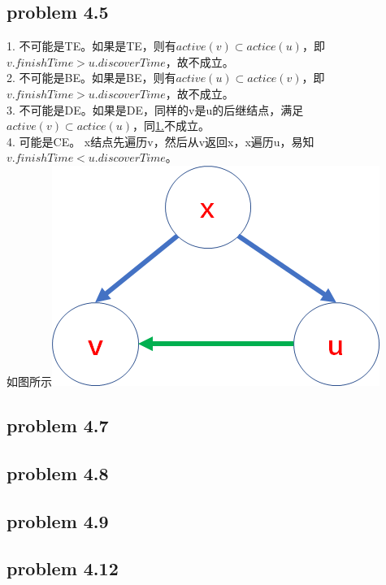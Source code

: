 \documentclass[11pt,a4paper,oneside,oldfontcommands]{ctexart}
\begin{document}
{\subsection*{problem 4.5}}
\noindent \hypertarget{1.}{1. }不可能是TE。如果是TE，则有$active(v)\subset actice(u)$，即$v.finishTime>u.discoverTime$，故不成立。\\
2. 不可能是BE。如果是BE，则有$active(u)\subset actice(v)$，即$v.finishTime>u.discoverTime$，故不成立。\\
3. 不可能是DE。如果是DE，同样的v是u的后继结点，满足$active(v)\subset actice(u)$，同\hyperref[1.]{1.}不成立。\\
4. 可能是CE。
x结点先遍历v，然后从v返回x，x遍历u，易知$v.finishTime<u.discoverTime$。\\
如图所示\includegraphics{CEORDER.png}\\
{\subsection*{problem 4.7}}
{\subsection*{problem 4.8}}
{\subsection*{problem 4.9}}
{\subsection*{problem 4.12}}
\end{document}
